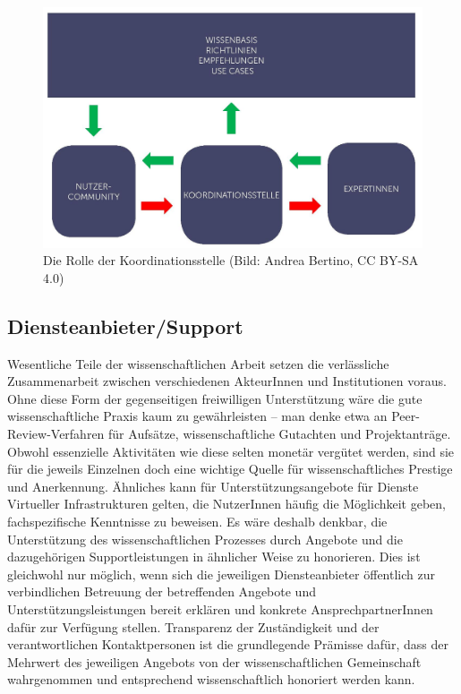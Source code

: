 \documentclass[a4paper,
fontsize=11pt,
oneside,
numbers=noperiodatend,
parskip=half-,
bibliography=totoc,
final
]{scrartcl}
\begin{document}
\begin{figure}
\centering
\includegraphics{img/Koordinationsstelle.jpg}
\caption{Die Rolle der Koordinationsstelle (Bild: Andrea Bertino, CC
BY-SA 4.0)}
\end{figure}

\hypertarget{diensteanbietersupport}{%
\subsection{Diensteanbieter/Support}\label{diensteanbietersupport}}

Wesentliche Teile der wissenschaftlichen Arbeit setzen die verlässliche
Zusammenarbeit zwischen verschiedenen AkteurInnen und Institutionen
voraus. Ohne diese Form der gegenseitigen freiwilligen Unterstützung
wäre die gute wissenschaftliche Praxis kaum zu gewährleisten -- man
denke etwa an Peer-Review-Verfahren für Aufsätze, wissenschaftliche
Gutachten und Projektanträge. Obwohl essenzielle Aktivitäten wie diese
selten monetär vergütet werden, sind sie für die jeweils Einzelnen doch
eine wichtige Quelle für wissenschaftliches Prestige und Anerkennung.
Ähnliches kann für Unterstützungsangebote für Dienste Virtueller
Infrastrukturen gelten, die NutzerInnen häufig die Möglichkeit geben,
fachspezifische Kenntnisse zu beweisen. Es wäre deshalb denkbar, die
Unterstützung des wissenschaftlichen Prozesses durch Angebote und die
dazugehörigen Supportleistungen in ähnlicher Weise zu honorieren. Dies
ist gleichwohl nur möglich, wenn sich die jeweiligen Diensteanbieter
öffentlich zur verbindlichen Betreuung der betreffenden Angebote und
Unterstützungsleistungen bereit erklären und konkrete
AnsprechpartnerInnen dafür zur Verfügung stellen. Transparenz der
Zuständigkeit und der verantwortlichen Kontaktpersonen ist die
grundlegende Prämisse dafür, dass der Mehrwert des jeweiligen Angebots
von der wissenschaftlichen Gemeinschaft wahrgenommen und entsprechend
wissenschaftlich honoriert werden kann.
\end{document}

